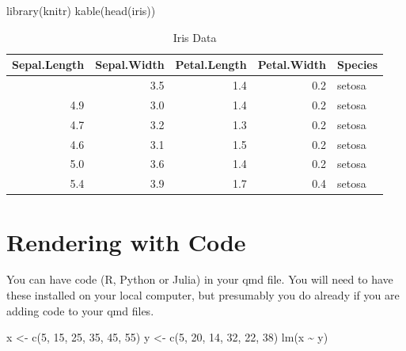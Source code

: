 \documentclass[
  letterpaper,
  oneside,
  open=any]{scrbook}
\newenvironment{Shaded}{\begin{snugshade}}{\end{snugshade}}
\newcommand{\DecValTok}[1]{\textcolor[rgb]{0.68,0.00,0.00}{#1}}
\newcommand{\FunctionTok}[1]{\textcolor[rgb]{0.28,0.35,0.67}{#1}}
\newcommand{\NormalTok}[1]{\textcolor[rgb]{0.00,0.23,0.31}{#1}}
\newcommand{\OtherTok}[1]{\textcolor[rgb]{0.00,0.23,0.31}{#1}}
\newcommand{\SpecialCharTok}[1]{\textcolor[rgb]{0.37,0.37,0.37}{#1}}
\begin{document}
\begin{Shaded}
\begin{Highlighting}[]
\FunctionTok{library}\NormalTok{(knitr)}
\FunctionTok{kable}\NormalTok{(}\FunctionTok{head}\NormalTok{(iris))}
\end{Highlighting}
\end{Shaded}

\begin{longtable}[]{@{}rrrrl@{}}

\caption{\label{tbl-iris}Iris Data}

\tabularnewline

\toprule\noalign{}
Sepal.Length & Sepal.Width & Petal.Length & Petal.Width & Species \\
\midrule\noalign{}
\endhead
\bottomrule\noalign{}
\endlastfoot
5.1 & 3.5 & 1.4 & 0.2 & setosa \\
4.9 & 3.0 & 1.4 & 0.2 & setosa \\
4.7 & 3.2 & 1.3 & 0.2 & setosa \\
4.6 & 3.1 & 1.5 & 0.2 & setosa \\
5.0 & 3.6 & 1.4 & 0.2 & setosa \\
5.4 & 3.9 & 1.7 & 0.4 & setosa \\

\end{longtable}


\chapter{Rendering with Code}\label{rendering-with-code}

You can have code (R, Python or Julia) in your qmd file. You will need
to have these installed on your local computer, but presumably you do
already if you are adding code to your qmd files.

\begin{Shaded}
\begin{Highlighting}[]
\NormalTok{x }\OtherTok{\textless{}{-}} \FunctionTok{c}\NormalTok{(}\DecValTok{5}\NormalTok{, }\DecValTok{15}\NormalTok{, }\DecValTok{25}\NormalTok{, }\DecValTok{35}\NormalTok{, }\DecValTok{45}\NormalTok{, }\DecValTok{55}\NormalTok{)}
\NormalTok{y }\OtherTok{\textless{}{-}} \FunctionTok{c}\NormalTok{(}\DecValTok{5}\NormalTok{, }\DecValTok{20}\NormalTok{, }\DecValTok{14}\NormalTok{, }\DecValTok{32}\NormalTok{, }\DecValTok{22}\NormalTok{, }\DecValTok{38}\NormalTok{)}
\FunctionTok{lm}\NormalTok{(x }\SpecialCharTok{\textasciitilde{}}\NormalTok{ y)}
\end{Highlighting}
\end{Shaded}
\end{document}
